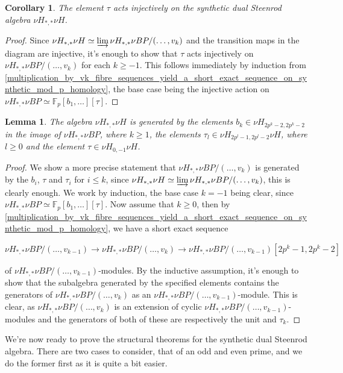 \documentclass[oneside,a4paper]{amsart}
\newcommand{\fieldp}{\mathbb{F}_{p}} %
\theoremstyle{plain}
\newtheorem{lemma}[thm]{Lemma}
\newtheorem{cor}[thm]{Corollary}
\theoremstyle{definition}
\theoremstyle{remark}
\begin{document}
\begin{cor}
\label{cor:tau_acts_injectively_on_the_synthetic_dual_steenrod_algebra}
The element $\tau$ acts injectively on the synthetic dual Steenrod algebra $\nu H_{*, *} \nu H$. 
\end{cor}

\begin{proof}
Since $\nu H_{*, *} \nu H \simeq \varinjlim \nu H_{*, *} \nu BP / (\ldots, v_{k})$ and the transition maps in the diagram are injective, it's enough to show that $\tau$ acts injectively on $\nu H_{*, *} \nu BP / (\ldots, v_{k})$ for each $k \geq -1$. This follows immediately by induction from \cref{multiplication_by_vk_fibre_sequences_yield_a_short_exact_sequence_on_synthetic_mod_p_homology}, the base case being the injective action on $\nu H_{*, *} \nu BP \simeq \fieldp[b_{1}, \ldots][\tau]$.
\end{proof}

\begin{lemma}
\label{lemma:b_and_tau_and_tauk_generate_the_synthetic_dual_steenrod_algebra}
The algebra $\nu H_{*, *} \nu H$ is generated by the elements $b_{k} \in \nu H_{2p^{k}-2, 2p^{k}-2}$ in the image of $\nu H_{*, *} \nu BP$, where $k \geq 1$, the elements $\tau_{l} \in \nu H_{2p^{l}-1, 2p^{l}-2} \nu H$, where $l \geq 0$ and the element $\tau \in \nu H_{0, -1} \nu H$.
\end{lemma}

\begin{proof}
We show a more precise statement that $\nu H_{*, *} \nu BP / (\ldots, v_{k})$ is generated by the $b_{i}$, $\tau$ and $\tau_{i}$ for $i \leq k$, since $\nu H_{*, *} \nu H \simeq \varinjlim \nu H_{*, *} \nu BP / (\ldots, v_{k})$, this is clearly enough. We work by induction, the base case $k = -1$ being clear, since $\nu H_{*, *} \nu BP \simeq \fieldp[b_{1}, \ldots][\tau]$. Now assume that $k \geq 0$, then by \cref{multiplication_by_vk_fibre_sequences_yield_a_short_exact_sequence_on_synthetic_mod_p_homology}, we have a short exact sequence 

\begin{center}
$\nu H _{*, *} \nu BP/(\ldots, v_{k-1}) \rightarrow \nu H_{*, *} \nu BP / (\ldots, v_{k}) \rightarrow \nu H_{*, *} \nu BP / (\ldots, v_{k-1})[2p^{k}-1, 2p^{k}-2]$
\end{center}
of $\nu H _{*, *} \nu BP/(\ldots, v_{k-1})$-modules. By the inductive assumption, it's enough to show that the subalgebra generated by the specified elements contains the generators of $\nu H_{*, *} \nu BP / (\ldots, v_{k})$ as an $\nu H _{*, *} \nu BP/(\ldots, v_{k-1})$-module. This is clear, as $\nu H_{*, *} \nu BP / (\ldots, v_{k})$ is an extension of cyclic $\nu H _{*, *} \nu BP/(\ldots, v_{k-1})$-modules and the generators of both of these are respectively the unit and $\tau_{k}$. 
\end{proof}
We're now ready to prove the structural theorems for the synthetic dual Steenrod algebra. There are two cases to consider, that of an odd and even prime, and we do the former first as it is quite a bit easier. 
\end{document}
